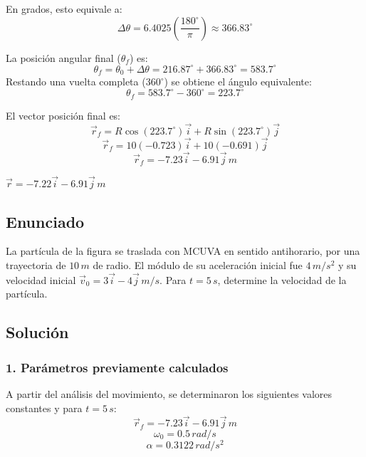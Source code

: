 \documentclass[12pt, a4paper]{article}
\begin{document}
En grados, esto equivale a:
$$ \Delta\theta = 6.4025 \left(\frac{180^\circ}{\pi}\right) \approx 366.83^\circ $$

La posición angular final ($\theta_f$) es:
$$ \theta_f = \theta_0 + \Delta\theta = 216.87^\circ + 366.83^\circ = 583.7^\circ $$
Restando una vuelta completa ($360^\circ$) se obtiene el ángulo equivalente:
$$ \theta_f = 583.7^\circ - 360^\circ = 223.7^\circ $$

El vector posición final es:
$$ \vec{r}_f = R\cos(223.7^\circ)\vec{i} + R\sin(223.7^\circ)\vec{j} $$
$$ \vec{r}_f = 10(-0.723)\vec{i} + 10(-0.691)\vec{j} $$
$$ \vec{r}_f = -7.23\vec{i} - 6.91\vec{j} \, \si{m} $$

\begin{tcolorbox}[colback=green!5!white, colframe=green!50!black, title=Respuesta Final]
\centering \Large $\vec{r} = -7.22\vec{i} - 6.91\vec{j} \, \si{m}$
\end{tcolorbox}

\newpage

\subsection*{Enunciado}
La partícula de la figura se traslada con MCUVA en sentido antihorario, por una trayectoria de $10 \, \si{m}$ de radio. El módulo de su aceleración inicial fue $4 \, \si{m/s^2}$ y su velocidad inicial $\vec{v}_0 = 3\vec{i} - 4\vec{j} \, \si{m/s}$. Para $t = 5 \, \si{s}$, determine la velocidad de la partícula.

\begin{center}
\end{center}

\subsection*{Solución}

\subsubsection*{1. Parámetros previamente calculados}
A partir del análisis del movimiento, se determinaron los siguientes valores constantes y para $t = 5 \, \si{s}$:
$$ \vec{r}_f = -7.23\vec{i} - 6.91\vec{j} \, \si{m} $$
$$ \omega_0 = 0.5 \, \si{rad/s} $$
$$ \alpha = 0.3122 \, \si{rad/s^2} $$
\end{document}
